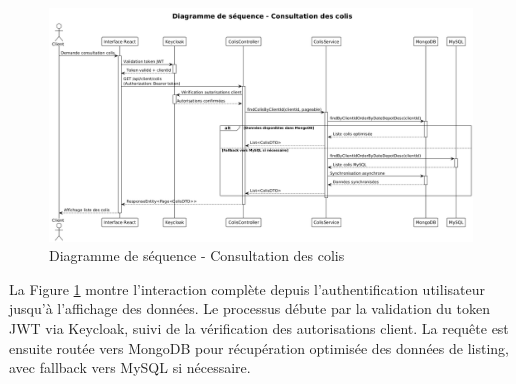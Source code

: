 \begin{figure}[H]
\centering
\includegraphics[width=1.0\textwidth]{images/sequence_consultation.png}
\caption{Diagramme de séquence - Consultation des colis}
\label{fig:sequence_consultation}
\end{figure}
La Figure \ref{fig:sequence_consultation} montre l'interaction complète depuis l'authentification utilisateur jusqu'à l'affichage des données. Le processus débute par la validation du token JWT via Keycloak, suivi de la vérification des autorisations client. La requête est ensuite routée vers MongoDB pour récupération optimisée des données de listing, avec fallback vers MySQL si nécessaire.

